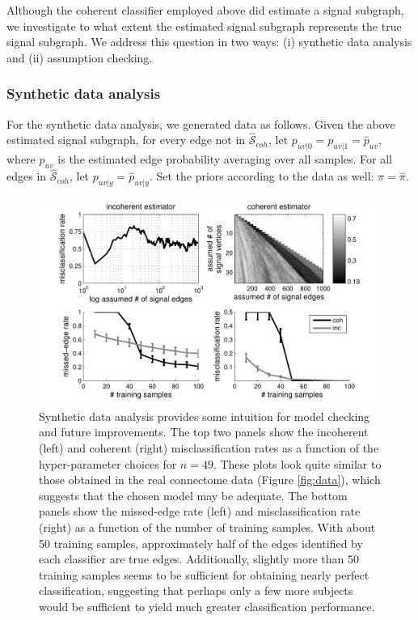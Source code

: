 \documentclass[10pt,journal,cspaper,compsoc]{IEEEtran}
\providecommand{\wh}[1]{\widehat{#1}}
\providecommand{\mhc}[1]{\widehat{\mathcal{#1}}}
\begin{document}
Although the coherent classifier employed above did estimate a signal subgraph, we investigate to what extent the estimated signal subgraph represents the true signal subgraph.  We address this question in two ways:  (i) synthetic data analysis and (ii) assumption checking.  

\subsubsection{Synthetic data analysis} %
\label{ssub:synthetic_data_analysis}

For the synthetic data analysis, we generated data as follows.  Given the above estimated signal subgraph, for every edge not in $\mhc{S}_{coh}$, let $p_{uv|0}=p_{uv|1}=\wh{p}_{uv}$, where $\wh{p}_{uv}$ is the estimated edge probability averaging over all samples.  For all edges in $\mhc{S}_{coh}$, let $p_{uv|y}=\wh{p}_{uv|y}$.  Set the priors according to the data as well: $\pi=\wh{\pi}$.  

\begin{figure}[tb!]
	\centering
		\includegraphics[width=0.7\linewidth]{../figs/BLSA0317_Count_synthetic_Lhats.pdf}
	\caption{Synthetic data analysis provides some intuition for model checking and future improvements.  The top two panels show the incoherent (left) and coherent (right) misclassification rates as a function of the hyper-parameter choices for $n=49$.  These plots look quite similar to those obtained in the real connectome data (Figure \ref{fig:data}), which suggests that the chosen model may be adequate.  The bottom panels show the missed-edge rate (left) and misclassification rate (right) as a function of the number of training samples.  With about 50 training samples, approximately half of the edges identified by each classifier are true edges.  Additionally, slightly more than 50 training samples seems to be sufficient for obtaining nearly perfect classification, suggesting that perhaps only a few more subjects would be sufficient to yield much greater classification performance.}
	\label{fig:synthetic}
\end{figure}
\end{document}
